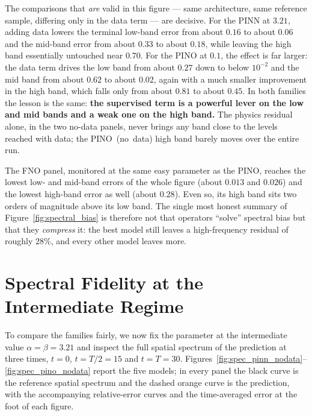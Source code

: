 The comparisons that \emph{are} valid in this figure --- same architecture, same reference sample, differing only in the data term --- are decisive. For the PINN at $3.21$, adding data lowers the terminal low-band error from about $0.16$ to about $0.06$ and the mid-band error from about $0.33$ to about $0.18$, while leaving the high band essentially untouched near $0.70$. For the PINO at $0.1$, the effect is far larger: the data term drives the low band from about $0.27$ down to below $10^{-2}$ and the mid band from about $0.62$ to about $0.02$, again with a much smaller improvement in the high band, which falls only from about $0.81$ to about $0.45$. In both families the lesson is the same: \textbf{the supervised term is a powerful lever on the low and mid bands and a weak one on the high band.} The physics residual alone, in the two no-data panels, never brings any band close to the levels reached with data; the PINO~(no~data) high band barely moves over the entire run.

The FNO panel, monitored at the same easy parameter as the PINO, reaches the lowest low- and mid-band errors of the whole figure (about $0.013$ and $0.026$) and the lowest high-band error as well (about $0.28$). Even so, its high band sits two orders of magnitude above its low band. The single most honest summary of Figure~\ref{fig:spectral_bias} is therefore not that operators ``solve'' spectral bias but that they \emph{compress} it: the best model still leaves a high-frequency residual of roughly $28\%$, and every other model leaves more.

\section{Spectral Fidelity at the Intermediate Regime}
\label{sec:res_spectral_fidelity}

To compare the families fairly, we now fix the parameter at the intermediate value $\alpha = \beta = 3.21$ and inspect the full spatial spectrum of the prediction at three times, $t = 0$, $t = T/2 = 15$ and $t = T = 30$. Figures~\ref{fig:spec_pinn_nodata}--\ref{fig:spec_pino_nodata} report the five models; in every panel the black curve is the reference spatial spectrum and the dashed orange curve is the prediction, with the accompanying relative-error curves and the time-averaged error at the foot of each figure.

